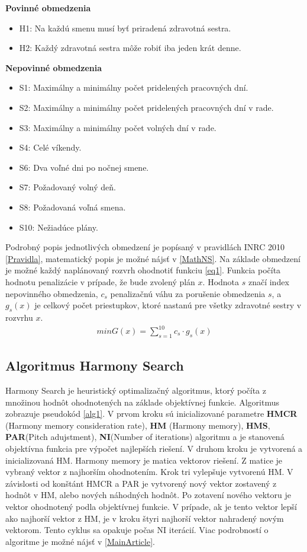 \documentclass[a4paper, 14pt]{article}
\begin{document}
\newpage
\textbf{Povinné obmedzenia}
\begin{itemize}
\item H1: Na každú smenu musí byť priradená zdravotná sestra.
\item H2: Každý zdravotná sestra môže robiť iba jeden krát denne.
\end{itemize}
\par\textbf{Nepovinné obmedzenia}
\begin{itemize}
\item S1: Maximálny a minimálny počet pridelených pracovných dní.
\item S2: Maximálny a minimálny počet pridelených pracovných dní v rade.
\item S3: Maximálny a minimálny počet volných dní v rade.
\item S4: Celé víkendy.
\item S6: Dva voľné dni po nočnej smene.
\item S7: Požadovaný volný deň.
\item S8: Požadovaná voľná smena.
\item S10: Nežiadúce plány.
\end{itemize}
Podrobný popis jednotlivých obmedzení je popísaný v pravidlách INRC 2010 \ref{Pravidla}, matematický popis je možné nájsť v \ref{MathNS}. Na základe obmedzení je možné každý naplánovaný rozvrh ohodnotiť funkciu \ref{eq1}. Funkcia počíta hodnotu penalizácie v prípade, že bude zvolený plán $x$. Hodnota $s$ značí index nepovinného obmedzenia, $c_s$ penalizačnú váhu za porušenie obmedzenia $s$, a $g_s(x)$ je celkový počet priestupkov, ktoré nastanú pre všetky zdravotné sestry v rozvrhu  $x$. 
\begin{eqnarray}
\label{eq1}
min G(x) = {\sum_{s=1}^{10} c_s \cdot g_s(x)}
\end{eqnarray}

\subsection{Algoritmus Harmony Search}
Harmony Search je heuristický optimalizačný algoritmus, ktorý počíta z množinou hodnôt ohodnotených na základe objektívnej funkcie. Algoritmus zobrazuje pseudokód \ref{alg1}. V prvom kroku sú inicializované parametre \textbf{HMCR} (Harmony memory consideration rate), \textbf{HM} (Harmony memory), \textbf{HMS}, \textbf{PAR}(Pitch adujstment), \textbf{NI}(Number of iterations) algoritmu a je stanovená objektívna funkcia pre výpočet najlepších riešení. V druhom kroku je vytvorená a inicializovaná HM. Harmony memory je matica vektorov riešení. Z matice je vybraný vektor z najhorším ohodnotením. Krok tri vylepšuje vytvorenú HM. V závislosti od konštánt HMCR a PAR je vytvorený nový vektor zostavený z hodnôt v HM, alebo nových náhodných hodnôt. Po zotavení nového vektoru je vektor ohodnotený podla objektívnej funkcie. V prípade, ak je tento vektor lepší ako najhorší vektor z HM, je v kroku štyri najhorší vektor nahradený novým vektorom. Tento cyklus sa opakuje počas NI iterácií. Viac podrobností o algoritme je možné nájsť v \ref{MainArticle}.\\
\end{document}
